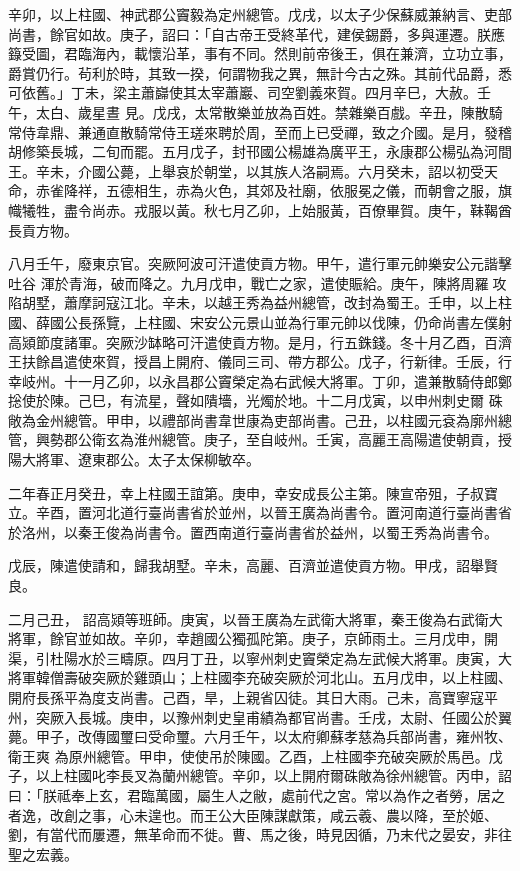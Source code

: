 \begin{pinyinscope}
 辛卯，以上柱國、神武郡公竇毅為定州總管。戊戌，以太子少保蘇威兼納言、吏部尚書，餘官如故。庚子，詔曰：「自古帝王受終革代，建侯錫爵，多與運遷。朕應籙受圖，君臨海內，載懷沿革，事有不同。然則前帝後王，俱在兼濟，立功立事，爵賞仍行。茍利於時，其致一揆，何謂物我之異，無計今古之殊。其前代品爵，悉可依舊。」丁未，梁主蕭巋使其太宰蕭巖、司空劉義來賀。四月辛巳，大赦。壬午，太白、歲星晝
 見。戊戌，太常散樂並放為百姓。禁雜樂百戲。辛丑，陳散騎常侍韋鼎、兼通直散騎常侍王瑳來聘於周，至而上已受禪，致之介國。是月，發稽胡修築長城，二旬而罷。五月戊子，封邗國公楊雄為廣平王，永康郡公楊弘為河間王。辛未，介國公薨，上舉哀於朝堂，以其族人洛嗣焉。六月癸未，詔以初受天命，赤雀降祥，五德相生，赤為火色，其郊及社廟，依服冕之儀，而朝會之服，旗幟犧牲，盡令尚赤。戎服以黃。秋七月乙卯，上始服黃，百僚畢賀。庚午，靺鞨酋長貢方物。



 八月壬午，廢東京官。突厥阿波可汗遣使貢方物。甲午，遣行軍元帥樂安公元諧擊吐谷
 渾於青海，破而降之。九月戊申，戰亡之家，遣使賑給。庚午，陳將周羅攻陷胡墅，蕭摩訶寇江北。辛未，以越王秀為益州總管，改封為蜀王。壬申，以上柱國、薛國公長孫覽，上柱國、宋安公元景山並為行軍元帥以伐陳，仍命尚書左僕射高熲節度諸軍。突厥沙缽略可汗遣使貢方物。是月，行五銖錢。冬十月乙酉，百濟王扶餘昌遣使來賀，授昌上開府、儀同三司、帶方郡公。戊子，行新律。壬辰，行幸岐州。十一月乙卯，以永昌郡公竇榮定為右武候大將軍。丁卯，遣兼散騎侍郎鄭捴使於陳。己巳，有流星，聲如隤墻，光燭於地。十二月戊寅，以申州刺史爾
 硃敞為金州總管。甲申，以禮部尚書韋世康為吏部尚書。己丑，以柱國元袞為廓州總管，興勢郡公衛玄為淮州總管。庚子，至自岐州。壬寅，高麗王高陽遣使朝貢，授陽大將軍、遼東郡公。太子太保柳敏卒。



 二年春正月癸丑，幸上柱國王誼第。庚申，幸安成長公主第。陳宣帝殂，子叔寶立。辛酉，置河北道行臺尚書省於並州，以晉王廣為尚書令。置河南道行臺尚書省於洛州，以秦王俊為尚書令。置西南道行臺尚書省於益州，以蜀王秀為尚書令。



 戊辰，陳遣使請和，歸我胡墅。辛未，高麗、百濟並遣使貢方物。甲戌，詔舉賢良。



 二月己丑，
 詔高熲等班師。庚寅，以晉王廣為左武衛大將軍，秦王俊為右武衛大將軍，餘官並如故。辛卯，幸趙國公獨孤陀第。庚子，京師雨土。三月戊申，開渠，引杜陽水於三疇原。四月丁丑，以寧州刺史竇榮定為左武候大將軍。庚寅，大將軍韓僧壽破突厥於雞頭山；上柱國李充破突厥於河北山。五月戊申，以上柱國、開府長孫平為度支尚書。己酉，旱，上親省囚徒。其日大雨。己未，高寶寧寇平州，突厥入長城。庚申，以豫州刺史皇甫績為都官尚書。壬戌，太尉、任國公於翼薨。甲子，改傳國璽曰受命璽。六月壬午，以太府卿蘇孝慈為兵部尚書，雍州牧、衛王爽
 為原州總管。甲申，使使吊於陳國。乙酉，上柱國李充破突厥於馬邑。戊子，以上柱國叱李長叉為蘭州總管。辛卯，以上開府爾硃敞為徐州總管。丙申，詔曰：「朕祗奉上玄，君臨萬國，屬生人之敝，處前代之宮。常以為作之者勞，居之者逸，改創之事，心未遑也。而王公大臣陳謀獻策，咸云羲、農以降，至於姬、劉，有當代而屢遷，無革命而不徙。曹、馬之後，時見因循，乃末代之晏安，非往聖之宏義。




\end{pinyinscope}
